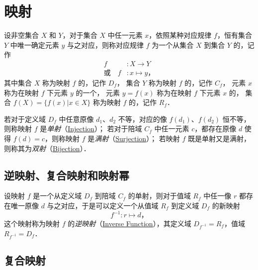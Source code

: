 \newpage
\section{映射}

\begin{Definition}[\textbf{映射}]\label{Definition:Map}
    设非空集合 $X$ 和 $Y$，对于集合 $X$ 中任一元素 $x$，依照某种对应规律 $f$，恒有集合 $Y$ 中唯一确定元素 $y$ 与之对应，则称对应规律 $f$ 为一个从集合 $X$ 到集合 $Y$ 的，记作
    \[
        \begin{aligned}
            f&: X \to Y \\
            \text{或} \quad f&: x \mapsto y \text{，}
        \end{aligned}
    \]
    其中集合 $X$ 称为映射 $f$ 的，记作 $D_f$，
    集合 $Y$ 称为映射 $f$ 的，记作 $C_f$，
    元素 $x$ 称为在映射 $f$ 下元素 $y$ 的一个，
    元素 $ y = f(x) $ 称为在映射 $f$ 下元素 $x$ 的，
    集合 $ f(X) = \{ f(x) | x \in X \} $ 称为映射 $f$ 的，记作 $R_f$．
\end{Definition}

若对于定义域 $D_f$ 中任意原像 $d_1$、$d_2$ 不等，对应的像 $f(d_1)$、$f(d_2)$ 恒不等，则称映射 $f$ 是\emph{单射}（\href{http://mathworld.wolfram.com/Injection.html}{Injection}）；
若对于陪域 $C_f$ 中任一元素 $c$，都存在原像 $d$ 使得 $f(d)=c$，则称映射 $f$ 是\emph{满射}（\href{http://mathworld.wolfram.com/Surjection.html}{Surjection}）；
若映射 $f$ 既是单射又是满射，则称其为\emph{双射}（\href{http://mathworld.wolfram.com/Bijection.html}{Bijection}）．

\subsection{逆映射、复合映射和映射幂}

设映射 $f$ 是一个从定义域 $D_f$ 到陪域 $C_f$ 的单射，则对于值域 $R_f$ 中任一像 $r$ 都存在唯一原像 $d$ 与之对应，于是可以定义一个从值域 $R_f$ 到定义域 $D_f$ 的新映射
\[
f^{-1}: r \mapsto d \text{，}
\]
这个映射称为映射 $f$ 的\emph{逆映射}（\href{http://mathworld.wolfram.com/InverseFunction.html}{Inverse Function}），其定义域 $D_{f^{-1}}=R_f$，值域 $R_{f^{-1}}=D_f$．

\subsection{复合映射}

